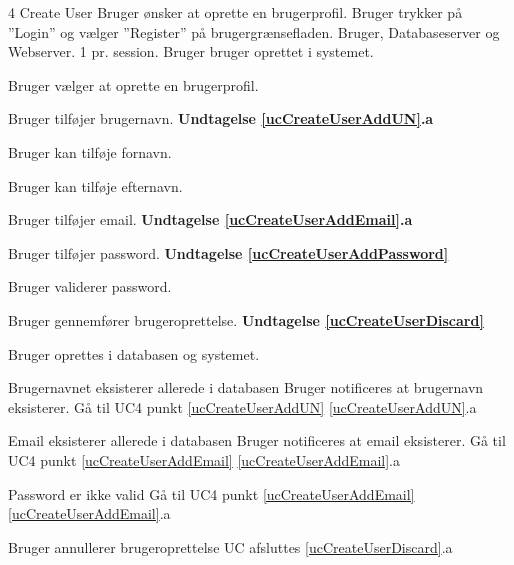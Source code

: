 
\uchead
	{4}
	{Create User}
	{Bruger ønsker at oprette en brugerprofil.}
	{Bruger trykker på ''Login'' og vælger ''Register'' på brugergrænsefladen.}
	{Bruger, Databaseserver og Webserver.}
	{}
	{1 pr. session.}
	{Bruger bruger oprettet i systemet.}

\item \label{ucCreateUserOptions} Bruger vælger at oprette en brugerprofil. \newline

\item \label{ucCreateUserAddUN} Bruger tilføjer brugernavn.
\textbf{Undtagelse \ref{ucCreateUserAddUN}.a}

\item Bruger kan tilføje fornavn.
\item Bruger kan tilføje efternavn.

\item \label{ucCreateUserAddEmail} Bruger tilføjer email.
\textbf{Undtagelse \ref{ucCreateUserAddEmail}.a}

\item Bruger tilføjer password.
\textbf{Undtagelse \ref{ucCreateUserAddPassword}}

\item Bruger validerer password.

\item Bruger gennemfører brugeroprettelse.
\textbf{Undtagelse \ref{ucCreateUserDiscard}}

\item \label{ucCreateUserCreated} Bruger oprettes i databasen og systemet.

\ucdescriptionend


	
	
\ucextension
	{Brugernavnet eksisterer allerede i databasen}
	{Bruger notificeres at brugernavn eksisterer.\newline
	Gå til UC4 punkt \ref{ucCreateUserAddUN}}
	{\ref{ucCreateUserAddUN}.a}
	


\ucextension
	{Email eksisterer allerede i databasen}
	{Bruger notificeres at email eksisterer.\newline
	Gå til UC4 punkt \ref{ucCreateUserAddEmail}}
	{\ref{ucCreateUserAddEmail}.a}



\ucextension
	{Password er ikke valid}
	{Gå til UC4 punkt \ref{ucCreateUserAddEmail}}
	{\ref{ucCreateUserAddEmail}.a}



\ucextension
	{Bruger annullerer brugeroprettelse}
	{UC afsluttes}
	{\ref{ucCreateUserDiscard}.a}
		
